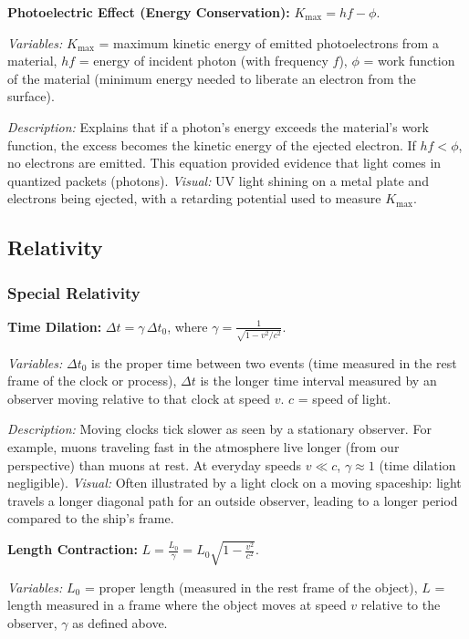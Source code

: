 \documentclass{article}
\begin{document}
\textbf{Photoelectric Effect (Energy Conservation):} $K_{\text{max}} = h f - \phi$.

\textit{Variables:} $K_{\text{max}}$ = maximum kinetic energy of emitted photoelectrons from a material, $h f$ = energy of incident photon (with frequency $f$), $\phi$ = work function of the material (minimum energy needed to liberate an electron from the surface).

\textit{Description:} Explains that if a photon’s energy exceeds the material’s work function, the excess becomes the kinetic energy of the ejected electron. If $h f < \phi$, no electrons are emitted. This equation provided evidence that light comes in quantized packets (photons). \textit{Visual:} UV light shining on a metal plate and electrons being ejected, with a retarding potential used to measure $K_{\text{max}}$.

\subsection*{Relativity}

\subsubsection*{Special Relativity}

\textbf{Time Dilation:} $\displaystyle \Delta t = \gamma\, \Delta t_0$, where $\displaystyle \gamma = \frac{1}{\sqrt{1 - v^2/c^2}}$.

\textit{Variables:} $\Delta t_0$ is the proper time between two events (time measured in the rest frame of the clock or process), $\Delta t$ is the longer time interval measured by an observer moving relative to that clock at speed $v$. $c$ = speed of light.

\textit{Description:} Moving clocks tick slower as seen by a stationary observer. For example, muons traveling fast in the atmosphere live longer (from our perspective) than muons at rest. At everyday speeds $v \ll c$, $\gamma \approx 1$ (time dilation negligible). \textit{Visual:} Often illustrated by a light clock on a moving spaceship: light travels a longer diagonal path for an outside observer, leading to a longer period compared to the ship’s frame.

\textbf{Length Contraction:} $L = \frac{L_0}{\gamma} = L_0 \sqrt{1 - \frac{v^2}{c^2}}$.

\textit{Variables:} $L_0$ = proper length (measured in the rest frame of the object), $L$ = length measured in a frame where the object moves at speed $v$ relative to the observer, $\gamma$ as defined above.
\end{document}

